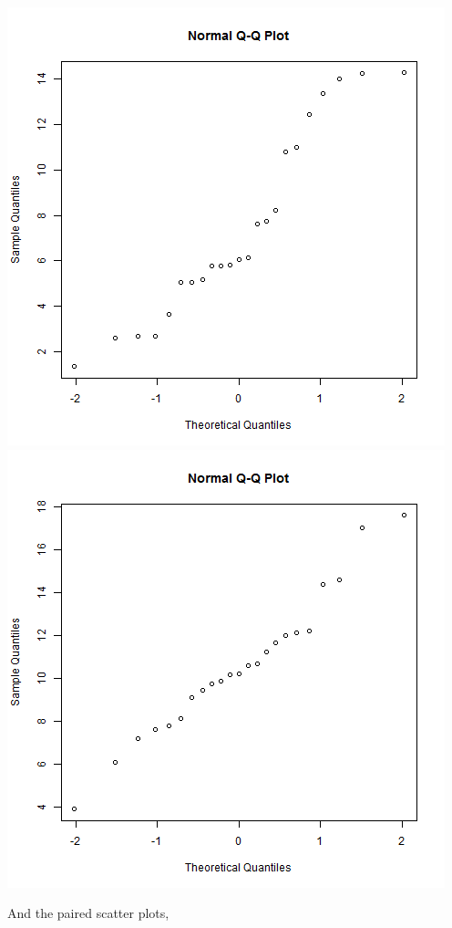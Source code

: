 \documentclass[letterpaper,10pt]{article}
\begin{document}
\begin{description}
\begin{enumerate}
\begin{center}
\includegraphics[scale=.33]{QQRepairOut.png}
\includegraphics[scale=.33]{QQCapitalOut.png}
\end{center}
And the paired scatter plots,
\begin{center}

\end{center}
\end{enumerate}
\end{description}
\end{document}
